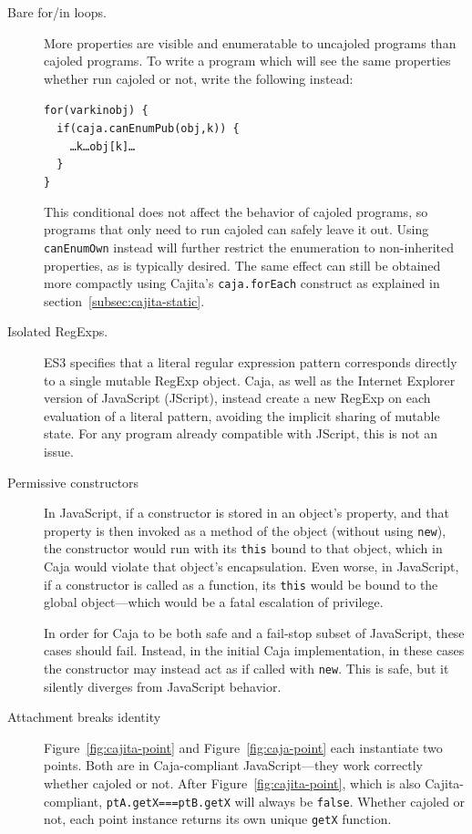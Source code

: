 \documentclass[letterpaper,twocolumn,10pt]{article}
\newcommand{\code}[1]{{\tt {#1}}}              %
\begin{document}
\begin{description}

  \item[Bare for/in loops.] More properties are visible and enumeratable to 
  uncajoled programs than cajoled programs. To write a program which 
  will see the same properties whether run cajoled or not, write the 
  following instead:
%
\begin{alltt}
for (var k in obj)\ \{ 
\ \ if (caja.canEnumPub(obj,k))\ \{
\ \ \ \ {\ldots}k{\ldots}obj[k]\ldots
\ \ \}
\}
\end{alltt}
%
  This conditional does not affect the behavior of cajoled programs, so
  programs that only need to run cajoled can safely leave it out. Using
  \code{canEnumOwn} instead will further restrict the enumeration to
  non-inherited properties, as is typically desired. The same effect can still
  be obtained more compactly using Cajita's \code{caja.forEach} construct as
  explained in section~\ref{subsec:cajita-static}.

  \item[Isolated RegExps.] ES3 specifies that a literal regular expression 
  pattern corresponds directly to a single mutable RegExp object. Caja, as 
  well as the Internet Explorer version of JavaScript (JScript), instead 
  create a new RegExp on each evaluation of a literal pattern, avoiding the 
  implicit sharing of mutable state. For any program already compatible with 
  JScript, this is not an issue.
  
  \item[Permissive constructors] In JavaScript, if a constructor is stored in an 
  object's property, and that property is then invoked as a method of 
  the object (without using \code{new}), the constructor would run with its 
  \code{this} bound to that object, which in Caja would violate that object's 
  encapsulation. Even worse, in JavaScript, if a constructor is called 
  as a function, its \code{this} would be bound to the global 
  object---which would be a fatal escalation of privilege.
  
  In order for Caja to be both safe and a fail-stop subset of JavaScript, 
  these cases should fail. Instead, in the initial Caja implementation, in 
  these cases the constructor may instead act as if called with \code{new}. 
  This is safe, but it silently diverges from JavaScript behavior.
  
  \item[Attachment breaks identity] Figure~\ref{fig:cajita-point} and 
  Figure~\ref{fig:caja-point} each instantiate two points. Both are in 
  Caja-compliant JavaScript---they work correctly whether cajoled or not. 
  After Figure~\ref{fig:cajita-point}, which is also Cajita-compliant, 
  \code{ptA.getX===ptB.getX} will always be \code{false}. Whether cajoled or 
  not, each point instance returns its own unique \code{getX} function.
  

\end{description}
\end{document}

